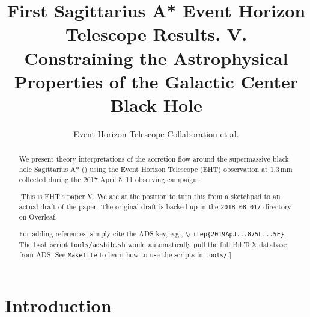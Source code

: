 \documentclass[twocolumn,twocolappendix,tighten,dvipsnames,linenumbers]{aastex63}
\begin{document}
\title{First Sagittarius A* Event Horizon Telescope Results. V.\\
  Constraining the Astrophysical Properties of the Galactic Center Black Hole}

\author{Event Horizon Telescope Collaboration et al.}


\received{\today}
\revised{\today}

\begin{abstract}
  We present theory interpretations of the accretion flow around the
  supermassive black hole Sagittarius A* (\sgra) using the Event
  Horizon Telescope (EHT) observation at 1.3\,mm collected during the
  2017 April 5--11 observing campaign.

  \color{BrickRed}

  [This is EHT's \sgra paper V.
  We are at the position to turn this from a sketchpad to an actual
  draft of the paper.
  The original draft is backed up in the \texttt{2018-08-01/}
  directory on Overleaf.

  For adding references, simply cite the ADS key, e.g.,
  \texttt{\textbackslash citep\{2019ApJ...875L...5E\}}.
  The bash script \texttt{tools/adsbib.sh} would automatically pull
  the full BibTeX database from ADS.
  See \texttt{Makefile} to learn how to use the scripts in
  \texttt{tools/}.]
\end{abstract}


\tableofcontents
\clearpage

\section{Introduction}
\end{document}
